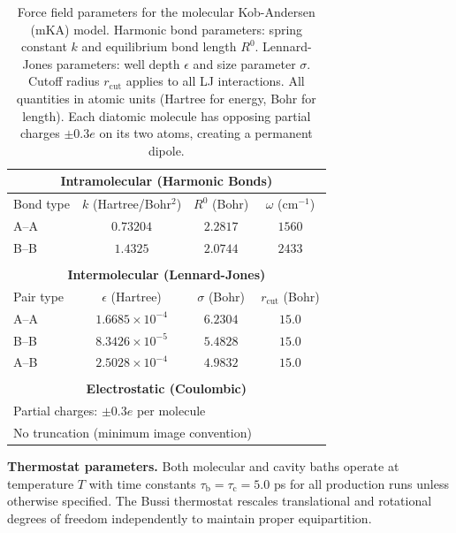 \documentclass[%
 reprint,
 amsmath,amssymb,
 aps,
]{revtex4-2}
\begin{document}
\begin{table}[t]
\caption{\label{tab:forcefield}Force field parameters for the molecular Kob-Andersen (mKA) model. Harmonic bond parameters: spring constant $k$ and equilibrium bond length $R^0$. Lennard-Jones parameters: well depth $\epsilon$ and size parameter $\sigma$. Cutoff radius $r_\mathrm{cut}$ applies to all LJ interactions. All quantities in atomic units (Hartree for energy, Bohr for length). Each diatomic molecule has opposing partial charges $\pm 0.3e$ on its two atoms, creating a permanent dipole.}
\begin{ruledtabular}
\begin{tabular}{lccc}
\multicolumn{4}{c}{\textbf{Intramolecular (Harmonic Bonds)}} \\
\hline
Bond type & $k$ (Hartree/Bohr$^2$) & $R^0$ (Bohr) & $\omega$ (cm$^{-1}$) \\
\hline
A--A & $0.73204$ & $2.2817$ & $1560$ \\
B--B & $1.4325$ & $2.0744$ & $2433$ \\
\hline
\multicolumn{4}{c}{} \\
\multicolumn{4}{c}{\textbf{Intermolecular (Lennard-Jones)}} \\
\hline
Pair type & $\epsilon$ (Hartree) & $\sigma$ (Bohr) & $r_\mathrm{cut}$ (Bohr) \\
\hline
A--A & $1.6685 \times 10^{-4}$ & $6.2304$ & $15.0$ \\
B--B & $8.3426 \times 10^{-5}$ & $5.4828$ & $15.0$ \\
A--B & $2.5028 \times 10^{-4}$ & $4.9832$ & $15.0$ \\
\hline
\multicolumn{4}{c}{} \\
\multicolumn{4}{c}{\textbf{Electrostatic (Coulombic)}} \\
\hline
\multicolumn{4}{l}{Partial charges: $\pm 0.3e$ per molecule} \\
\multicolumn{4}{l}{No truncation (minimum image convention)} \\
\end{tabular}
\end{ruledtabular}
\end{table}

\textbf{Thermostat parameters.}
Both molecular and cavity baths operate at temperature $T$ with time constants $\tau_\mathrm{b} = \tau_\mathrm{c} = 5.0$ ps for all production runs unless otherwise specified.
The Bussi thermostat rescales translational and rotational degrees of freedom independently to maintain proper equipartition.
\end{document}
